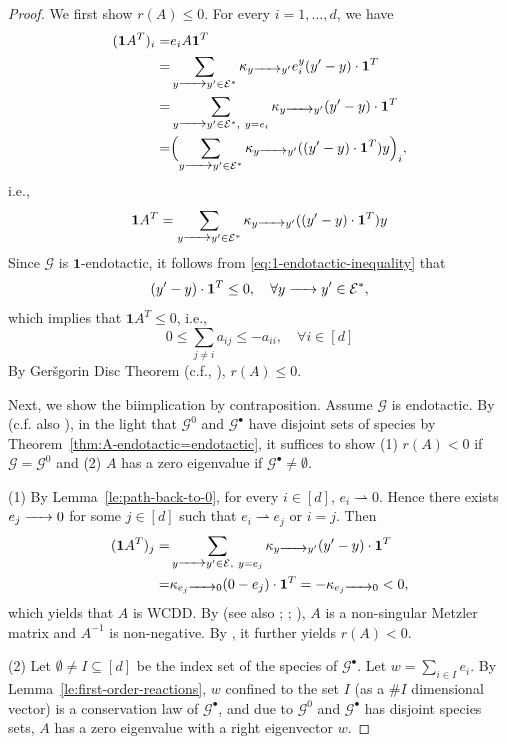 \documentclass[10pt]{amsart}
\numberwithin{equation}{section}
\theoremstyle{plain}
\theoremstyle{definition}
\theoremstyle{remark}
\newcommand{\cG}{\mathcal{G}}
\newcommand{\cI}{I}
\begin{document}
\begin{proof}
We first show $r(A)\le0$. For every $i=1,\ldots,d$, we have
\begin{align*}
(\mathbf{1}A^T)_i =& e_iA\mathbf{1}^T\\
=& \sum_{y\ce{->[]} y'\in \mathcal{E}^*}\kappa_{y\ce{->[]} y'}e_i^y(y'-y)\cdot\mathbf{1}^T\\
=&\sum_{y\ce{->[]} y'\in \mathcal{E}^*,\ y=e_i}\kappa_{y\ce{->[]} y'}(y'-y)\cdot\mathbf{1}^T\\
=&\Bigl(\sum_{y\ce{->[]} y'\in \mathcal{E}^*}\kappa_{y\ce{->[]} y'}((y'-y)\cdot\mathbf{1}^T)y\Bigr)_i,
\end{align*}
i.e.,
\begin{equation*}
\mathbf{1}A^T= \sum_{y\ce{->[]} y'\in \mathcal{E}^*}\kappa_{y\ce{->[]} y'}((y'-y)\cdot\mathbf{1}^T)y
\end{equation*}
Since $\cG$ is $\mathbf{1}$-endotactic, it follows from \eqref{eq:1-endotactic-inequality} that 
$$(y'-y)\cdot\mathbf{1}^T\le0,\quad \forall y\ce{->[]} y'\in\mathcal{E}^*,$$ which implies that 
$\mathbf{1}A^T\le0$, i.e.,
\[0\le\sum_{j\neq i}a_{ij}\le -a_{ii},\quad \forall i\in[d]\]
By Ger\v{s}gorin Disc Theorem (c.f.,  \cite[Theorem~6.1.1]{HJ13}), $r(A)\le0$.

Next, we show the biimplication by contraposition. Assume $\cG$ is endotactic. By \cite[Theorem~2.5.3]{HJ94} (c.f. also \cite[Chapter 6, Theorem~2.3]{BP94}), in the light that $\cG^0$ and $\cG^{\bullet}$ have disjoint sets of species by Theorem~\ref{thm:A-endotactic=endotactic}, it suffices to show (1) $r(A)<0$ if $\cG=\cG^0$ and (2) $A$ has a zero eigenvalue if $\cG^{\bullet}\neq\emptyset$.
\medskip

\noindent(1) By Lemma~\ref{le:path-back-to-0}, for every $i\in[d]$,  $e_i\rightharpoonup0$. Hence there exists $e_j\ce{->}0$ for some $j\in[d]$ such that $e_i\rightharpoonup e_j$ or $i=j$. Then \begin{align*}
(\mathbf{1}A^T)_j = & \sum_{y\ce{->[]} y'\in\mathcal{E},\ y=e_j}\kappa_{y\ce{->[]} y'}(y'-y)\cdot\mathbf{1}^T\\
= & \kappa_{e_j\ce{->[]} 0}(0-e_j)\cdot\mathbf{1}^T=-\kappa_{e_j\ce{->[]} 0}<0,
\end{align*} which yields that $A$ is WCDD. By \cite[Theorem~2.1,Theorem~2.2]{BH64} (see also \cite{SC74};  \cite[Lemma~3.2]{AF16};  \cite[Corollary~6.2.27]{HJ13}), $A$ is a non-singular Metzler matrix and $A^{-1}$ is non-negative. By \cite[Theorem~2.5.3]{HJ94},  it further yields $r(A)<0$.
\medskip

\noindent(2) Let $\emptyset\neq I\subseteq[d]$ be the index set of the species of $\cG^{\bullet}$.  Let $w=\sum_{i\in\cI}e_i$. By Lemma~\ref{le:first-order-reactions}, $w$ confined to the set $I$ (as a $\#I$ dimensional vector) is a conservation law of $\cG^{\bullet}$, and due to $\cG^0$ and $\cG^{\bullet}$ has disjoint species sets, $A$ has a zero eigenvalue with a right eigenvector $w$.
\end{proof}
\end{document}
